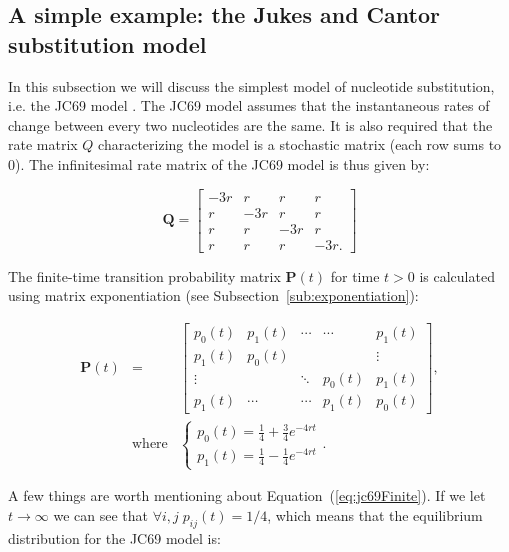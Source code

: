 \subsection{A simple example: the Jukes and Cantor substitution model\label{sub:jc69}}

In this subsection we will discuss the simplest model of nucleotide substitution, i.e. the JC69 model \citep{Jukes1969}.
The JC69 model assumes that the instantaneous rates of change between every two nucleotides are the same.
It is also required that the rate matrix $Q$ characterizing the model is a stochastic matrix (each row sums to 0).
The infinitesimal rate matrix of the JC69 model is thus given by:

\begin{equation}
\mathbf{Q}=\left[\begin{array}{cccc}
-3r & r & r & r\\
r & -3r & r & r\\
r & r & -3r & r\\
r & r & r & -3r.
\end{array}\right]
\label{eq:jc69}
\end{equation}

\noindent
The finite-time transition probability matrix $\mathbf{P}(t)$ for time $t>0$ is calculated using matrix exponentiation  (see Subsection~\ref{sub:exponentiation}):

\begin{align}
\mathbf{P}\left(t\right) &=& \left[\begin{array}{ccccc}
p_{0}(t) & p_{1}(t) & \cdots & \cdots & p_{1}(t)\\
p_{1}(t) & p_{0}(t) &  &  & \vdots\\
\vdots &  & \ddots & p_{0}(t) & p_{1}(t)\\
p_{1}(t) & \cdots & \cdots & p_{1}(t) & p_{0}(t)
\end{array}\right],  \nonumber \\
&\text{where}& \ensuremath{\begin{cases}
p_{0}(t)=\frac{1}{4}+\frac{3}{4}e^{-4rt}\\
p_{1}(t)=\frac{1}{4}-\frac{1}{4}e^{-4rt}
\end{cases}}.
\label{eq:jc69Finite}
\end{align}

\noindent
A few things are worth mentioning about Equation~(\ref{eq:jc69Finite}).
If we let $t\rightarrow \infty$ we can see that $\forall i,j\; p_{ij}(t)=1/4$, which means that the equilibrium distribution for the JC69 model is: 

